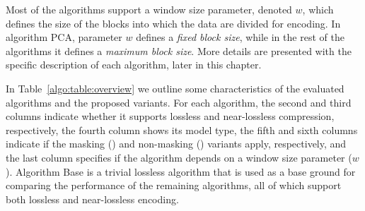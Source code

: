 Most of the algorithms support a window size parameter, denoted $w$, which defines the size of the blocks into which the data are divided for encoding. In algorithm PCA, parameter $w$ defines a \textit{fixed block size}, while in the rest of the algorithms it defines a \textit{maximum block size}. More details are presented with the specific description of each algorithm, later in this chapter.


In Table~\ref{algo:table:overview} we outline some characteristics of the evaluated algorithms and the proposed variants. For each algorithm, the second and third columns indicate whether it supports lossless and near-lossless compression, respectively, the fourth column shows its model type, the fifth and sixth columns indicate if the masking (\maskalgo) and non-masking (\NOmaskalgo) variants apply, respectively, and the last column specifies if the algorithm depends on a window size parameter ($w$). Algorithm Base is a trivial lossless algorithm that is used as a base ground for comparing the performance of the remaining algorithms, all of which support both lossless and near-lossless encoding.


\clearpage




